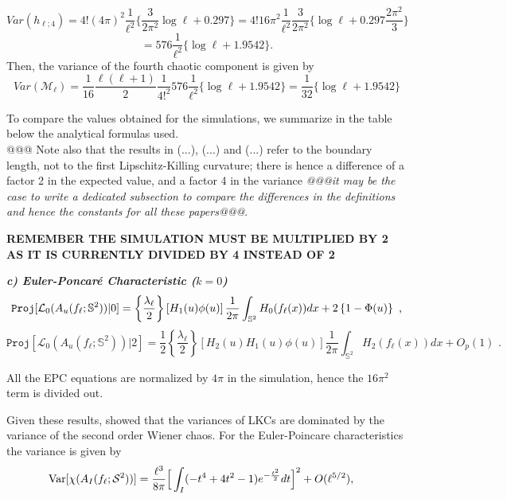 \documentclass[aps,prd,showpacs,superscriptaddress,groupedaddress]{revtex4-1}  %
\begin{document}
$$Var(h_{\ell;4})= 4! (4\pi)^2 \dfrac{1}{\ell^2} \bigg\{ \frac{3}{2\pi^2} \log \ell +0.297 \bigg\}= 4!16\pi^2 \dfrac{1}{\ell^2} \dfrac{3}{2\pi^2} \bigg\{ \log \ell+0.297\dfrac{2\pi^2}{3} \bigg\}$$
$$=576 \dfrac{1}{\ell^2} \bigg\{ \log \ell+1.9542 \bigg\}.$$
Then, the variance of the fourth chaotic component is given by
$$Var(\mathcal{M}_{\ell})=\dfrac{1}{16} \dfrac{\ell(\ell+1)}{2} \dfrac{1}{4!^2} 576 \dfrac{1}{\ell^2} \bigg\{ \log \ell+1.9542 \bigg\}= \dfrac{1}{32} \bigg\{ \log \ell+1.9542 \bigg\}$$


To compare the values obtained for the simulations, we summarize in the table below the analytical formulas used.\\
@@@
Note also that the results in (...), (...) and (...) refer to the boundary length, not to the first Lipschitz-Killing curvature; there is hence a difference of a factor 2 in the expected value, and a factor 4 in the variance \emph{@@@it may be the case to write a dedicated subsection to compare the differences in the definitions and hence the constants for all these papers@@@}.


{\bf REMEMBER THE SIMULATION MUST BE MULTIPLIED BY 2 AS IT IS CURRENTLY DIVIDED BY 4 INSTEAD OF 2}

\vspace{0.5cm}

\emph{\bf c) Euler-Poncar\'{e} Characteristic ($k=0$)} %
\begin{equation*}
\mathtt{Proj}[\mathcal{L}_{0}(A_{u}(f_{\ell };\mathbb{S}^{2}))|0]=\left\{ 
\frac{\lambda _{\ell }}{2}\right\} \left[ H_{1}(u)\phi (u)\right] \frac{1}{%
2\pi }\int_{\mathbb{S}^{2}}H_{0}(f_{\ell }(x))dx+2\left\{ 1-\Phi (u)\right\} 
\text{ ,}
\end{equation*}%
\begin{equation*}
\mathtt{Proj}[\mathcal{L}_{0}(A_{u}(f_{\ell };\mathbb{S}^{2}))|2]=\frac{1}{2}%
\left\{ \frac{\lambda _{\ell }}{2}\right\} \left[ H_{2}(u)H_{1}(u)\phi (u)%
\right] \frac{1}{2\pi }\int_{\mathbb{S}^{2}}H_{2}(f_{\ell }(x))dx+O_{p}(1)%
\text{ .}
\end{equation*}%

All the EPC equations are normalized by $4\pi$ in the simulation, hence the $16\pi^2$ term is divided out.

Given these results, \cite{cm1603} showed that the variances of LKCs
are dominated by the variance of the second order Wiener chaos. For
the Euler-Poincare characteristics the variance is given by
\begin{align*}
\text{Var}[\chi (A_{I}(f_{\ell }; {\cal S}^2) )]
&=\frac{\ell^3}{8 \pi } 
\Big[   \int_{I}  (-t^4+4 t^2 -1) e^{-\frac {t^2} 2 } d t \Big]^2+O(\ell^{5/2}),  
\end{align*}
\end{document}

